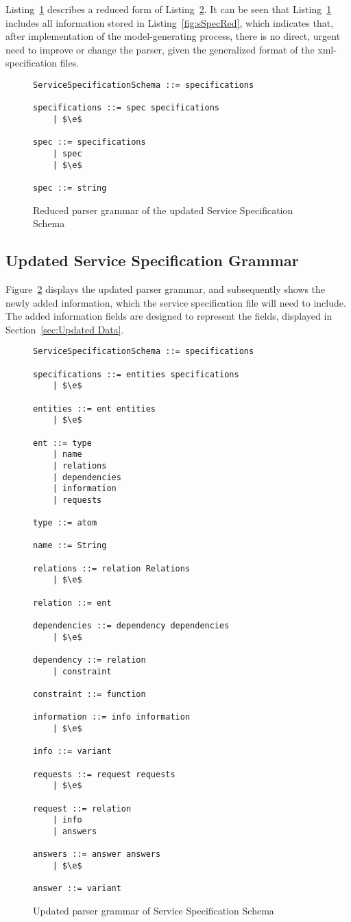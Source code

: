 Listing~\ref{fig:sSpecUpdRed} describes a reduced form of Listing~\ref{fig:sSpecUpd}. It can be seen that Listing~\ref{fig:sSpecUpdRed} includes all information stored in Listing~\ref{fig:sSpecRed}, which indicates that, after implementation of the model-generating process, there is no direct, urgent need to improve or change the parser, given the generalized format of the xml-specification files.

\begin{figure}[h]
	\centering
	\begin{lstlisting}[keywordstyle={}]
ServiceSpecificationSchema ::= specifications

specifications ::= spec specifications
    | $\e$
     
spec ::= specifications
    | spec
    | $\e$

spec ::= string
	\end{lstlisting}
	\caption{Reduced parser grammar of the updated Service Specification Schema}
	\label{fig:sSpecUpdRed}
\end{figure}

\subsection{Updated Service Specification Grammar}

Figure~\ref{fig:sSpecUpd} displays the updated parser grammar, and subsequently shows the newly added information, which the service specification file will need to include. The added information fields are designed to represent the fields, displayed in Section~\ref{sec:Updated Data}.

\begin{figure}
	\centering
	\begin{lstlisting}[keywordstyle={}]
ServiceSpecificationSchema ::= specifications

specifications ::= entities specifications
    | $\e$
     
entities ::= ent entities
    | $\e$

ent ::= type
    | name
    | relations
    | dependencies
    | information
    | requests

type ::= atom

name ::= String

relations ::= relation Relations
    | $\e$

relation ::= ent

dependencies ::= dependency dependencies
    | $\e$

dependency ::= relation
    | constraint

constraint ::= function

information ::= info information
    | $\e$

info ::= variant

requests ::= request requests
    | $\e$

request ::= relation
    | info
    | answers

answers ::= answer answers
    | $\e$

answer ::= variant
	\end{lstlisting}
	\caption{Updated parser grammar of Service Specification Schema}
	\label{fig:sSpecUpd}
\end{figure}

